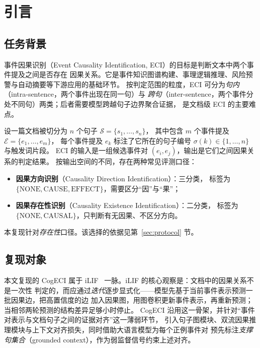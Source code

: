 \section{引言}

\subsection{任务背景}

事件因果识别（Event Causality Identification, ECI）的目标是判断文本中两个事件提及之间是否存在
因果关系。它是事件知识图谱构建、事理逻辑推理、风险预警与自动摘要等下游应用的基础环节。
按判定范围的粒度，ECI 可分为\emph{句内}（intra-sentence，两个事件出现在同一句）与
\emph{跨句}（inter-sentence，两个事件分处不同句）两类；后者需要模型跨越句子边界聚合证据，
是文档级 ECI 的主要难点。

设一篇文档被切分为 $n$ 个句子 $\mathcal{S}=\{s_1,\dots,s_n\}$，
其中包含 $m$ 个事件提及 $\mathcal{E}=\{e_1,\dots,e_m\}$，
每个事件提及 $e_k$ 标注了它所在的句子编号 $\sigma(k)\in\{1,\dots,n\}$ 与触发词片段。
ECI 的输入是一组候选事件对 $(e_i,e_j)$，输出是它们之间因果关系的判定结果。
按输出空间的不同，存在两种常见评测口径：

\begin{itemize}
  \item \textbf{因果方向识别}（Causality Direction Identification）：三分类，
        标签为 $\{\text{NONE},\text{CAUSE},\text{EFFECT}\}$，需要区分“因”与“果”；
  \item \textbf{因果存在性识别}（Causality Existence Identification）：二分类，
        标签为 $\{\text{NONE},\text{CAUSAL}\}$，只判断有无因果、不区分方向。
\end{itemize}

本复现针对\emph{存在性}口径。该选择的依据见第~\ref{sec:protocol} 节。

\subsection{复现对象}

本文复现的 CogECI 属于 iLIF~\cite{ilif} 一脉。iLIF 的核心观察是：文档中的因果关系不是一次性
判定的，而应通过\emph{迭代}逐步显式化——模型先基于当前事件表示预测一批因果边，把高置信度的边
加入因果图，用图卷积更新事件表示，再重新预测；当相邻两轮预测的结构差异足够小时停止。
CogECI 沿用这一骨架，并针对“事件对表示与文档句子之间的证据对齐”这一薄弱环节，
引入句子图模块、双流因果推理模块与上下文对齐损失，同时借助大语言模型为每个正例事件对
预先标注\emph{支撑句集合}（grounded context），作为弱监督信号约束上述对齐。

